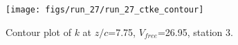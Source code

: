 \begin{figure}[H]
\centering
\texttt{[image: figs/run\_27/run\_27\_ctke\_contour]}
\caption{Contour plot of $k$ at $z/c$=7.75, $V_{free}$=26.95, station 3.}
\label{fig:run_27_ctke_contour}
\end{figure}


